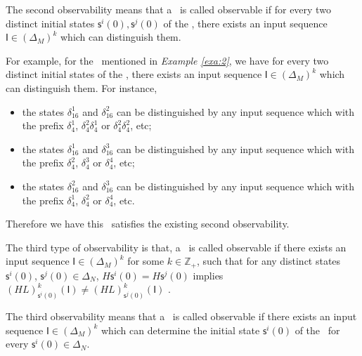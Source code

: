 The second observability means that a \BCN\ is called observable if for every two distinct initial states $\mathsf{s}^{i}(0), \mathsf{s}^{j}(0)$ of the \BCN, there exists an input sequence $\mathsf{I}\in(\Delta_M)^k$ which can distinguish them. 
\begin{example}
For example, for the \BCN\ mentioned in {\em Example \ref{exa:2}}, we have for every two distinct initial states of the \BCN, there exists an input sequence $\mathsf{I}\in(\Delta_M)^k$ which can distinguish them.  For instance,
\begin{itemize}
  \item the states $\delta_{16}^1$ and $\delta_{16}^2$ can be distinguished by any input sequence which with the prefix $\delta_{4}^1$, $\delta_{4}^2 \delta_{4}^1$ or $\delta_{4}^2 \delta_{4}^2$, etc;
  \item the states $\delta_{16}^1$ and $\delta_{16}^3$  can be distinguished by any input sequence which with the prefix $\delta_{4}^2$, $\delta_{4}^3$ or $\delta_{4}^4$, etc;
  \item the states $\delta_{16}^2$ and $\delta_{16}^3$  can be distinguished by any input sequence which with the prefix $\delta_{4}^1$, $\delta_{4}^2$ or $\delta_{4}^4$, etc.
\end{itemize} 

Therefore we have this \BCN\ satisfies the existing second observability.
\end{example}   
\begin{definition}
The third type of observability is that, a \BCN\ is called observable if there exists an input sequence $\mathsf{I}\in(\Delta_M)^k$ for some $k\in \mathbb{Z}_+$, such that for any distinct states $\mathsf{s}^{i}(0)$, $\mathsf{s}^{j}(0) \in \Delta_N$, $H\mathsf{s}^{i}(0)=H\mathsf{s}^{j}(0)$ implies $(HL)^k_{\mathsf{s}^{i}(0)}(\mathsf{I})\neq (HL)^k_{\mathsf{s}^{j}(0)}(\mathsf{I})$ \cite{Cheng2011Identification}.
\end{definition}

The third observability means that a \BCN\ is called observable if there exists an input sequence $\mathsf{I}\in(\Delta_M)^k$ which can determine the initial state $\mathsf{s}^{i}(0)$ of the \BCN\ for every $\mathsf{s}^{i}(0)\in\Delta_N$.

